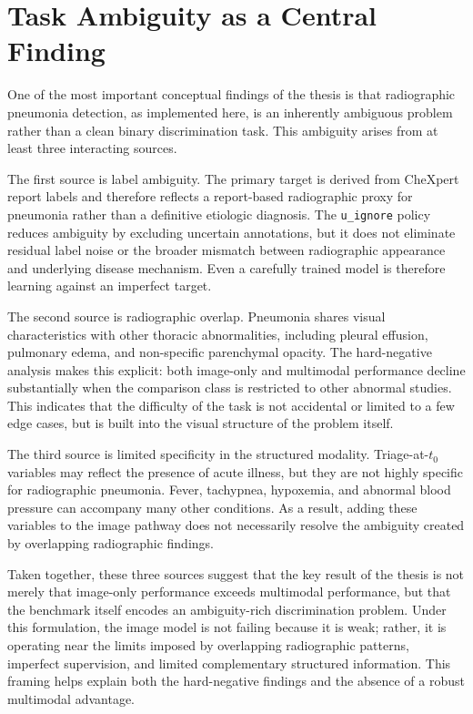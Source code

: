 \section{Task Ambiguity as a Central Finding}

One of the most important conceptual findings of the thesis is that radiographic pneumonia detection, as implemented here, is an inherently ambiguous problem rather than a clean binary discrimination task. This ambiguity arises from at least three interacting sources.

The first source is label ambiguity. The primary target is derived from CheXpert report labels and therefore reflects a report-based radiographic proxy for pneumonia rather than a definitive etiologic diagnosis. The \texttt{u\_ignore} policy reduces ambiguity by excluding uncertain annotations, but it does not eliminate residual label noise or the broader mismatch between radiographic appearance and underlying disease mechanism. Even a carefully trained model is therefore learning against an imperfect target.

The second source is radiographic overlap. Pneumonia shares visual characteristics with other thoracic abnormalities, including pleural effusion, pulmonary edema, and non-specific parenchymal opacity. The hard-negative analysis makes this explicit: both image-only and multimodal performance decline substantially when the comparison class is restricted to other abnormal studies. This indicates that the difficulty of the task is not accidental or limited to a few edge cases, but is built into the visual structure of the problem itself.

The third source is limited specificity in the structured modality. Triage-at-\(t_0\) variables may reflect the presence of acute illness, but they are not highly specific for radiographic pneumonia. Fever, tachypnea, hypoxemia, and abnormal blood pressure can accompany many other conditions. As a result, adding these variables to the image pathway does not necessarily resolve the ambiguity created by overlapping radiographic findings.

Taken together, these three sources suggest that the key result of the thesis is not merely that image-only performance exceeds multimodal performance, but that the benchmark itself encodes an ambiguity-rich discrimination problem. Under this formulation, the image model is not failing because it is weak; rather, it is operating near the limits imposed by overlapping radiographic patterns, imperfect supervision, and limited complementary structured information. This framing helps explain both the hard-negative findings and the absence of a robust multimodal advantage.

